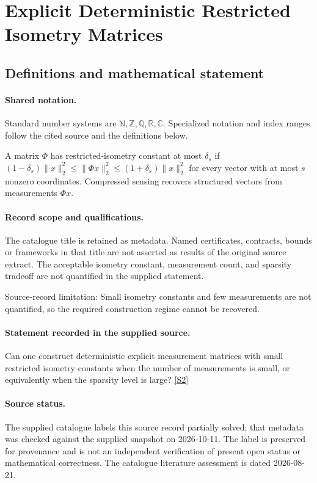 \documentclass[11pt]{article}
\newcommand{\sref}[2]{\hyperlink{source:#1:#2}{[S#2]}}
\begin{document}
\section{Explicit Deterministic Restricted Isometry Matrices}\label{statement}

\subsection{Definitions and mathematical statement}

\paragraph{Shared notation.}Standard number systems are $\mathbb N,\mathbb Z,\mathbb Q,\mathbb R,\mathbb C$. Specialized notation and index ranges follow the cited source and the definitions below.


A matrix $\Phi$ has restricted-isometry constant at most $\delta_s$ if $(1-\delta_s)\lVert x\rVert_2^2\leq\lVert\Phi x\rVert_2^2\leq(1+\delta_s)\lVert x\rVert_2^2$ for every vector with at most $s$ nonzero coordinates. Compressed sensing recovers structured vectors from measurements $\Phi x$.
\paragraph{Record scope and qualifications.}
The catalogue title is retained as metadata. Named certificates, contracts, bounds or frameworks in that title are not asserted as results of the original source extract.
The acceptable isometry constant, measurement count, and sparsity tradeoff are not quantified in the supplied statement.

Source-record limitation: Small isometry constants and few measurements are not quantified, so the required construction regime cannot be recovered.
\paragraph{Statement recorded in the supplied source.}
Can one construct deterministic explicit measurement matrices with small restricted isometry constants when the number of measurements is small, or equivalently when the sparsity level is large? \sref{statement}{2}
\paragraph{Source status.}
The supplied catalogue labels this source record partially solved; that metadata was checked against the supplied snapshot on 2026-10-11. The label is preserved for provenance and is not an independent verification of present open status or mathematical correctness. The catalogue literature assessment is dated 2026-08-21.
\end{document}
